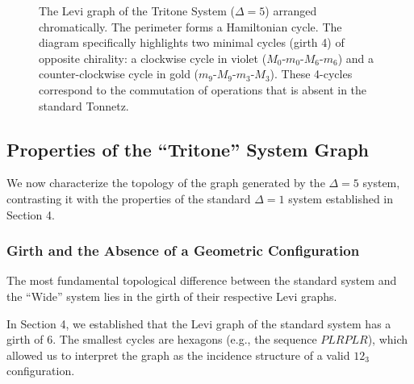 \documentclass[12pt,letterpaper]{amsart}
\begin{document}
\begin{figure}[H]
    \caption{The Levi graph of the Tritone System ($\Delta=5$) arranged chromatically. The perimeter forms a Hamiltonian cycle. The diagram specifically highlights two minimal cycles (girth 4) of opposite chirality: a clockwise cycle in violet ($M_0$-$m_0$-$M_6$-$m_6$) and a counter-clockwise cycle in gold ($m_9$-$M_9$-$m_3$-$M_3$). These 4-cycles correspond to the commutation of operations that is absent in the standard Tonnetz.}
    \label{fig:levi_wide_cycles}
\end{figure}

\subsection{Properties of the ``Tritone'' System  Graph}

We now characterize the topology of the graph generated by the $\Delta=5$ system, contrasting it with the properties of the standard $\Delta=1$ system established in Section 4.

\subsubsection{Girth and the Absence of a Geometric Configuration}
The most fundamental topological difference between the standard system and the ``Wide'' system lies in the girth of their respective Levi graphs.

In Section 4, we established that the Levi graph of the standard system has a girth of 6. The smallest cycles are hexagons (e.g., the sequence $PLRPLR$), which allowed us to interpret the graph as the incidence structure of a valid $12_3$ configuration.
\end{document}
